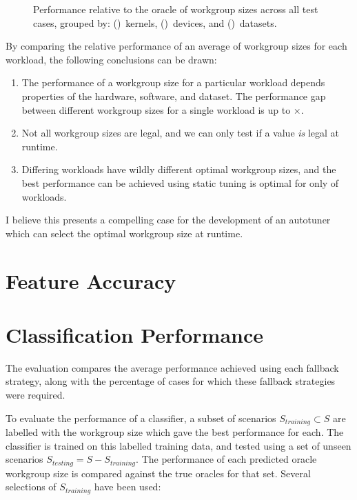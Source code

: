 \begin{figure}

\caption{%
  Performance relative to the oracle of workgroup sizes across all
  test cases, grouped by: ()~kernels,
  ()~devices, and
  ()~datasets.%
}
\label{fig:performances}
\end{figure}

By comparing the relative performance of an average of
 workgroup sizes for each workload, the
following conclusions can be drawn:

\begin{enumerate}
\item The performance of a workgroup size for a particular workload
  depends properties of the hardware, software, and dataset. The
  performance gap between different workgroup sizes for a single
  workload is up to $\times$.
\item Not all workgroup sizes are legal, and we can only test if a
  value \emph{is} legal at runtime.
\item Differing workloads have wildly different optimal workgroup
  sizes, and the best performance can be achieved using static tuning
  is optimal for only  of
  workloads.
\end{enumerate}

I believe this presents a compelling case for the development of an
autotuner which can select the optimal workgroup size at runtime.


\section{Feature Accuracy}




\section{Classification Performance}

The evaluation compares the average performance achieved using each
fallback strategy, along with the percentage of cases for which these
fallback strategies were required.

To evaluate the performance of a classifier, a subset of scenarios
$S_{training} \subset S$ are labelled with the workgroup size which
gave the best performance for each. The classifier is trained on this
labelled training data, and tested using a set of unseen scenarios
$S_{testing} = S - S_{training}$. The performance of each predicted
oracle workgroup size is compared against the true oracles for that
set. Several selections of $S_{training}$ have been used:

